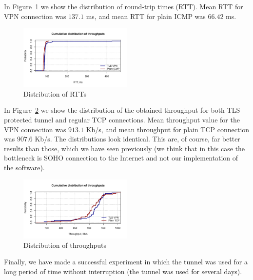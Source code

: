 In Figure~\ref{fig:rtt} we show the distribution of round-trip times
(RTT). Mean RTT for VPN connection was $137.1$ ms, and mean RTT for 
plain ICMP was $66.42$ ms.

\begin{figure}[!h]
        \includegraphics[width=0.5\textwidth]{graphics/rtt.pdf}
        \caption{Distribution of RTTs}
        \label{fig:rtt}
\end{figure}

In Figure~\ref{fig:iperf_distr} we show the distribution of the obtained throughput for both
TLS protected tunnel and regular TCP connections. Mean throughput value for the VPN connection was 
$913.1$ Kb/s, and mean throughput for plain TCP connection was $907.6$ Kb/s. The distributions 
look identical. This are, of course, far better results than those, which we have seen 
previously (we think that in this case the bottleneck is SOHO connection to the Internet
and not our implementation of the software).

\begin{figure}[!h]
        \includegraphics[width=0.5\textwidth]{graphics/throughput.pdf}
        \caption{Distribution of throughputs}
        \label{fig:iperf_distr}
\end{figure}

Finally, we have made a successful experiment in which the tunnel was used for a long period of time
without interruption (the tunnel was used for several days).

